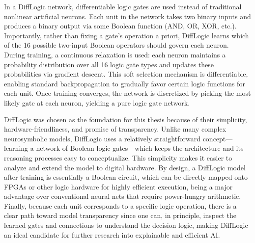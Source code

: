 In a DiffLogic network, differentiable logic gates are used instead of traditional nonlinear artificial neurons. Each unit in the network takes two binary inputs and produces a binary output via some Boolean function (AND, OR, XOR, etc.). Importantly, rather than fixing a gate’s operation a priori, DiffLogic learns which of the 16 possible two-input Boolean operators should govern each neuron. During training, a continuous relaxation is used: each neuron maintains a probability distribution over all 16 logic gate types and updates these probabilities via gradient descent. This soft selection mechanism is differentiable, enabling standard backpropagation to gradually favor certain logic functions for each unit. Once training converges, the network is discretized by picking the most likely gate at each neuron, yielding a pure logic gate network. 

DiffLogic was chosen as the foundation for this thesis because of their simplicity, hardware-friendliness, and promise of transparency. Unlike many complex neurosymbolic models, DiffLogic uses a relatively straightforward concept---learning a network of Boolean logic gates---which keeps the architecture and its reasoning processes easy to conceptualize. This simplicity makes it easier to analyze and extend the model to digital hardware. By design, a DiffLogic model after training is essentially a Boolean circuit, which can be directly mapped onto FPGAs or other logic hardware for highly efficient execution, being a major advantage over conventional neural nets that require power-hungry arithmetic. Finally, because each unit corresponds to a specific logic operation, there is a clear path toward model transparency since one can, in principle, inspect the learned gates and connections to understand the decision logic, making DiffLogic an ideal candidate for further research into explainable and efficient AI.




